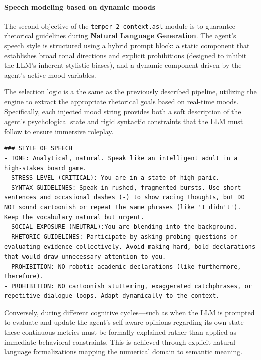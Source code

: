 \paragraph{\textbf{Speech modeling based on dynamic moods}} 
The second objective of the \texttt{temper\_2\_context.asl} module is to guarantee rhetorical guidelines during \textbf{Natural Language Generation}. The agent's speech style is structured using a hybrid prompt block: a static component that establishes broad tonal directions and explicit prohibitions (designed to inhibit the LLM's inherent stylistic biases), and a dynamic component driven by the agent's active mood variables. 

The selection logic is a the same as the previously described pipeline, utilizing the engine to extract the appropriate rhetorical goals based on real-time moods. Specifically, each injected mood string provides both a soft description of the agent's psychological state and rigid syntactic constraints that the LLM must follow to ensure immersive roleplay.

\begin{lstlisting}[frame=single, basicstyle=\footnotesize\ttfamily, breaklines=true, caption={Example of a generated speech style block. The dynamic parameters for STRESS LEVEL and SOCIAL EXPOSURE are evaluated and injected at execution time based on the agent's internal state.}, label={lst:style_of_speech}]
### STYLE OF SPEECH
- TONE: Analytical, natural. Speak like an intelligent adult in a high-stakes board game.
- STRESS LEVEL (CRITICAL): You are in a state of high panic.
  SYNTAX GUIDELINES: Speak in rushed, fragmented bursts. Use short sentences and occasional dashes (-) to show racing thoughts, but DO NOT sound cartoonish or repeat the same phrases (like 'I didn't'). Keep the vocabulary natural but urgent.
- SOCIAL EXPOSURE (NEUTRAL):You are blending into the background.
  RHETORIC GUIDELINES: Participate by asking probing questions or evaluating evidence collectively. Avoid making hard, bold declarations that would draw unnecessary attention to you.
- PROHIBITION: NO robotic academic declarations (like furthermore, therefore).
- PROHIBITION: NO cartoonish stuttering, exaggerated catchphrases, or repetitive dialogue loops. Adapt dynamically to the context.
\end{lstlisting}

Conversely, during different cognitive cycles—such as when the LLM is prompted to evaluate and update the agent's self-aware opinions regarding its own state—these continuous metrics must be formally explained rather than applied as immediate behavioral constraints. This is achieved through explicit natural language formalizations mapping the numerical domain to semantic meaning.

